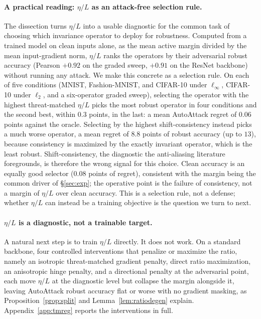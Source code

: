 \documentclass{article}
\theoremstyle{definition}
\begin{document}
\paragraph{A practical reading: $\eta/L$ as an attack-free selection rule.} The dissection turns $\eta/L$ into a usable diagnostic for the common task of choosing which invariance operator to deploy for robustness. Computed from a trained model on clean inputs alone, as the mean active margin divided by the mean input-gradient norm, $\eta/L$ ranks the operators by their adversarial robust accuracy (Pearson $+0.92$ on the graded sweep, $+0.91$ on the ResNet backbone) without running any attack. We make this concrete as a selection rule. On each of five conditions (MNIST, Fashion-MNIST, and CIFAR-10 under $\ell_\infty$, CIFAR-10 under $\ell_2$, and a six-operator graded sweep), selecting the operator with the highest threat-matched $\eta/L$ picks the most robust operator in four conditions and the second best, within $0.3$ points, in the last: a mean AutoAttack regret of $0.06$ points against the oracle. Selecting by the highest shift-consistency instead picks a much worse operator, a mean regret of $8.8$ points of robust accuracy (up to $13$), because consistency is maximized by the exactly invariant operator, which is the least robust. Shift-consistency, the diagnostic the anti-aliasing literature foregrounds, is therefore the wrong signal for this choice. Clean accuracy is an equally good selector ($0.08$ points of regret), consistent with the margin being the common driver of \S\ref{sec:exp}; the operative point is the failure of consistency, not a margin of $\eta/L$ over clean accuracy. This is a selection rule, not a defense; whether $\eta/L$ can instead be a training objective is the question we turn to next.

\paragraph{$\eta/L$ is a diagnostic, not a trainable target.} A natural next step is to train $\eta/L$ directly. It does not work. On a standard backbone, four controlled interventions that penalize or maximize the ratio, namely an isotropic threat-matched gradient penalty, direct ratio maximization, an anisotropic hinge penalty, and a directional penalty at the adversarial point, each move $\eta/L$ at the diagnostic level but collapse the margin alongside it, leaving AutoAttack robust accuracy flat or worse with no gradient masking, as Proposition~\ref{prop:split} and Lemma~\ref{lem:ratiodegen} explain. Appendix~\ref{app:tmreg} reports the interventions in full.
\end{document}
